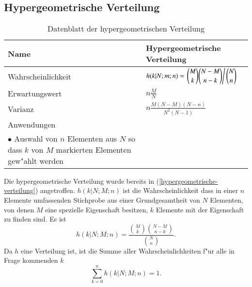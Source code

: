 %
%
%
\subsection{Hypergeometrische Verteilung} \label{section-hypergeometrischeverteilung}
\begin{table}
\renewcommand{\arraystretch}{1.5}
\begin{center}
\begin{tabular}{|l|l|}
\hline
Name&Hypergeometrische Verteilung\\
\hline
Wahrscheinlichkeit&
\begin{minipage}{3.7in}
\vskip3pt
$\displaystyle
h(k|N;m;n)=
\left.\binom{M}{k}\binom{N-M}{n-k}\right/\binom{N}{n}
$
\end{minipage}
\\[10pt]
Erwartungswert&$\displaystyle n\frac{M}{N}$\\[10pt]
Varianz&$\displaystyle
n\frac{M(N-M)(N-n)}{N^2(N-1)}
$\\[10pt]
\hline
Anwendungen&\begin{minipage}{3.7in}%
\vskip3pt
\strut
$\bullet$ Lotto\\
$\bullet$ Auswahl von $n$ Elementen aus $N$ so dass $k$ von $M$ markierten
Elementen gew"ahlt werden
\strut
\end{minipage}\\[18pt]
\hline
\end{tabular}
\end{center}
\caption{Datenblatt der hypergeometrischen Verteilung\label{datenblatt:hypergeometrischeverteilung}}
\end{table}

Die hypergeometrische Verteilung wurde bereits in
(\ref{hypergeometrische-verteilung}) angetroffen.
$h(k|N;M;n)$ ist die
Wahrscheinlichkeit dass in einer $n$ Elemente umfassenden Stichprobe aus
einer Grundgesamtheit von $N$ Elementen, von denen $M$ eine spezielle
Eigenschaft besitzen, $k$ Elemente mit der Eigenschaft zu finden sind.
Es ist
\[
h(k|N;M;n)=\frac{\binom{M}{k}\binom{N-M}{n-k}}{\binom{N}{n}}.
\]
Da $h$ eine Verteilung ist, ist die Summe aller Wahrscheinlichkeiten
f"ur alle in Frage kommenden $k$
\[
\sum_{k=0}^nh(k|N;M;n)=1.
\]
